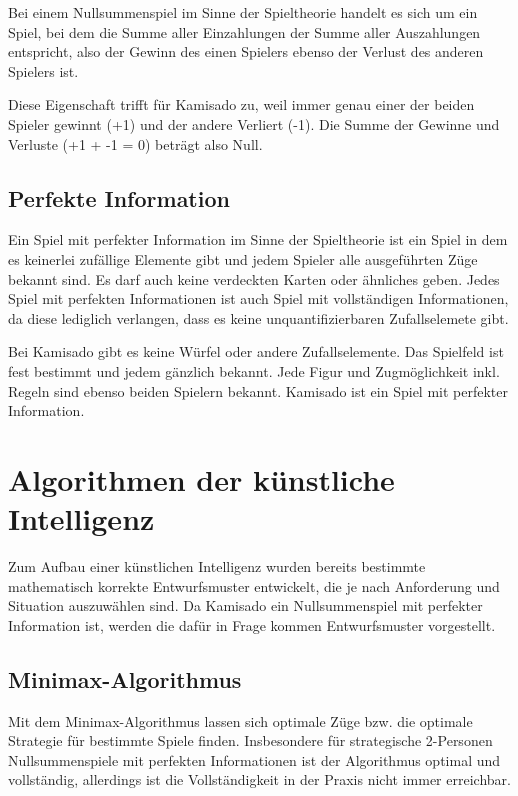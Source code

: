 \documentclass[
	12pt,
	halfparskip,
	a4paper,
	abstract,
	bibliography=totoc,
	liststotoc
]{scrreprt}
\begin{document}
Bei einem Nullsummenspiel im Sinne der Spieltheorie handelt es sich um ein Spiel, bei dem die Summe aller Einzahlungen der Summe aller Auszahlungen entspricht, also der Gewinn des einen Spielers ebenso der Verlust des anderen Spielers ist. \citep[S. 406]{strat}

Diese Eigenschaft trifft für Kamisado zu, weil immer genau einer der beiden Spieler gewinnt (+1) und der andere Verliert (-1). Die Summe der Gewinne und Verluste (+1 + -1 = 0) beträgt also Null.

\section{Perfekte Information}

Ein Spiel mit perfekter Information im Sinne der Spieltheorie ist ein Spiel in dem es keinerlei zufällige Elemente gibt und jedem Spieler alle ausgeführten Züge bekannt sind. Es darf auch keine verdeckten Karten oder ähnliches geben. Jedes Spiel mit perfekten Informationen ist auch Spiel mit vollständigen Informationen, da diese lediglich verlangen, dass es keine unquantifizierbaren Zufallselemete gibt. \citep[S. 65]{info}

Bei Kamisado gibt es keine Würfel oder andere Zufallselemente. Das Spielfeld ist fest bestimmt und jedem gänzlich bekannt. Jede Figur und Zugmöglichkeit inkl. Regeln sind ebenso beiden Spielern bekannt. Kamisado ist ein Spiel mit perfekter Information.


\chapter{Algorithmen der künstliche Intelligenz}

Zum Aufbau einer künstlichen Intelligenz wurden bereits bestimmte mathematisch korrekte Entwurfsmuster entwickelt, die je nach Anforderung und Situation auszuwählen sind. Da Kamisado ein Nullsummenspiel mit perfekter Information ist, werden die dafür in Frage kommen Entwurfsmuster vorgestellt.

\section{Minimax-Algorithmus}

Mit dem Minimax-Algorithmus lassen sich optimale Züge bzw. die optimale Strategie für bestimmte Spiele finden. Insbesondere für strategische 2-Personen Nullsummenspiele mit perfekten Informationen ist der Algorithmus optimal und vollständig, allerdings ist die Vollständigkeit in der Praxis nicht immer erreichbar. \citep[S. 161]{ai}
\end{document}
